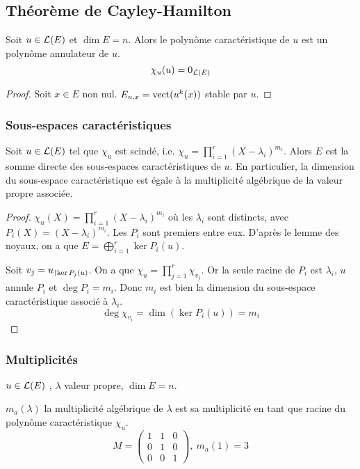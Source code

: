 \subsection{Théorème de Cayley-Hamilton}


\begin{theorem}
	Soit $u \in \mathcal{L}(E)$ et $\dim E = n$. Alors le polynôme caractéristique de $u$ est un polynôme annulateur de $u$.
	$$ \chi_u(u) = 0_{\mathcal{L}(E)}$$
\end{theorem}


\begin{proof}
	Soit $x \in E$ non nul. $E_{u,x} = \text{vect}(u^k(x))$ stable par $u$.

\end{proof}


\subsubsection{Sous-espaces caractéristiques}

\begin{coro}
	Soit $u \in \mathcal{L}(E)$ tel que $\chi_u$ est scindé, i.e. $\chi_u = \prod_{i=1}^r (X - \lambda_i)^{m_i}$.
	Alors $E$ est la somme directe des sous-espaces caractéristiques de $u$. En particulier, la dimension du
	sous-espace caractéristique est égale à la multiplicité algébrique de la valeur propre associée.
\end{coro}

\begin{proof}
	$\chi_u(X) = \prod_{i=1}^r (X - \lambda_i)^{m_i}$ où les $\lambda_i$ sont distincts, avec $P_i(X) = (X - \lambda_i)^{m_i}$.
	Les $P_i$ sont premiers entre eux. D'après le lemme des noyaux, on a que $E = \bigoplus_{i=1}^r \ker P_i(u)$.

	Soit $v_j = u_{\restriction \ker P_j(u)}$. On a que $\chi_u = \prod_{j=1}^r \chi_{v_j}$. Or la seule racine de $P_i$ est $\lambda_i$,
	$u$ annule $P_i$ et $\deg P_i = m_i$. Donc $m_i$ est bien la dimension du sous-espace caractéristique associé à $\lambda_i$.
	$$ \deg \chi_{v_i} = \dim (\ker P_i(u)) = m_i$$
\end{proof}

\subsubsection{Multiplicités}

$u \in \mathcal{L}(E)$ , $\lambda$ valeur propre, $\dim E = n$.

$m_a(\lambda)$ la multiplicité algébrique de $\lambda$ est sa multiplicité en tant que racine du polynôme caractéristique $\chi_u$.
$$ M = \begin{pmatrix}
		1 & 1 & 0 \\ 0 & 1 & 0 \\ 0 & 0 & 1
	\end{pmatrix},  \ m_a(1) = 3$$

